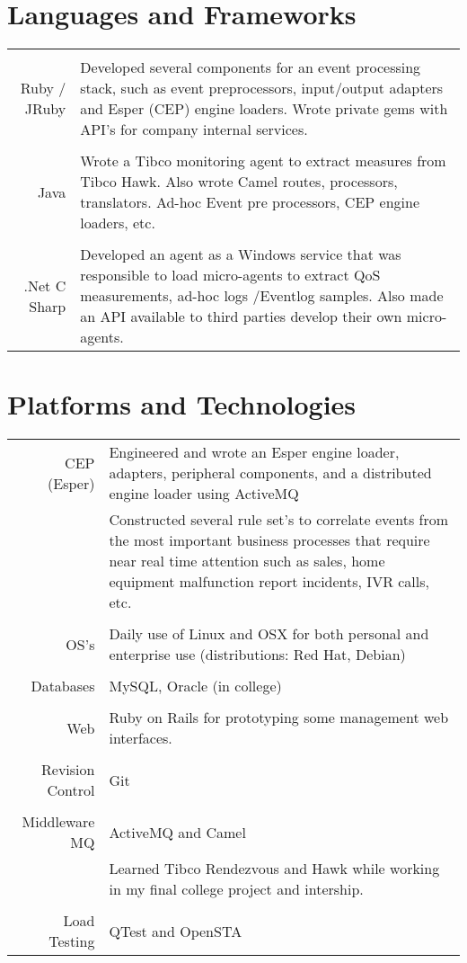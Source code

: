 \documentclass[a4paper,10pt]{article}
\begin{document}
\section{Languages and Frameworks}
\begin{tabular}{r|p{11cm}}
\multicolumn{2}{c}{} \\
	Ruby / JRuby
	& Developed several components for an event processing stack, such as event preprocessors, input/output adapters and Esper (CEP) engine loaders. 
	Wrote private gems with API's for company internal services.\\
\multicolumn{2}{c}{} \\
	Java
	&  Wrote a Tibco monitoring agent to extract measures from Tibco Hawk. Also wrote Camel routes, processors, translators. Ad-hoc Event pre processors, CEP engine loaders, etc.\\
\multicolumn{2}{c}{} \\
	.Net C Sharp
	&  Developed an agent as a Windows service that was responsible to load micro-agents to extract QoS measurements, ad-hoc logs /Eventlog samples. 
	Also made an API available to third parties develop their own micro-agents.\\
\end{tabular}

\section{Platforms and Technologies}
\begin{tabular}{r|p{11cm}}
	CEP (Esper) 
	& Engineered and wrote an Esper engine loader, adapters, peripheral components, and a distributed engine loader using ActiveMQ\\
	& Constructed several rule set's to correlate events from the most important business processes that require near real time attention such as sales, home equipment malfunction report incidents,
	    IVR calls, etc.\\
\multicolumn{2}{c}{} \\ 
	OS's 
	&  Daily use of Linux and OSX for both personal and enterprise use (distributions: Red Hat, Debian) \\
\multicolumn{2}{c}{} \\
	Databases 
	& MySQL, Oracle (in college)\\
\multicolumn{2}{c}{} \\
	Web 
	& Ruby on Rails for prototyping some management web interfaces.\\
\multicolumn{2}{c}{} \\
	Revision Control 
	& Git\\
\multicolumn{2}{c}{} \\
	Middleware \ MQ 
	& ActiveMQ and Camel\\
	& Learned Tibco Rendezvous and Hawk while working in my final college project and intership. \\
\multicolumn{2}{c}{} \\
	Load Testing 
	& QTest and OpenSTA
\end{tabular}
\end{document}
